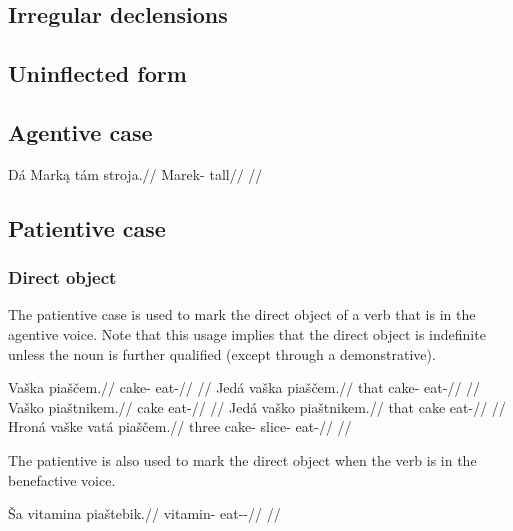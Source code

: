 \subsection{Irregular declensions}

\subsection{Uninflected form}


\subsection{Agentive case}

\pex
\begingl
\gla Dá Mark\k{a} tám stroja.//
\glb {} Marek-\Agt{} \Comp{} tall//
\glft {}//
\endgl
\xe


\subsection{Patientive case}

\subsubsection{Direct object}
The patientive case is used to mark the direct object of a verb that is in the agentive voice. Note that this usage implies that the direct object is indefinite unless the noun is further qualified (except through a demonstrative).

\pex
\a
\begingl
\gla Vaška piaščem.//
\glb cake-\Acc{} eat-//
\glft {}//
\endgl
\a
\begingl
\gla Jedá vaška piaščem.//
\glb that cake-\Acc{} eat-//
\glft {}//
\endgl
\a
\begingl
\gla Vaško piaštnikem.//
\glb cake eat-//
\glft {}//
\endgl
\a
\begingl
\gla Jedá vaško piaštnikem.//
\glb that cake eat-//
\glft {}//
\endgl
\a
\begingl
\gla Hroná vaške vatá piaščem.//
\glb three cake-\Gen{} slice-\Acc{} eat-//
\glft {}//
\endgl
\xe

The patientive is also used to mark the direct object when the verb is in the benefactive voice.

\pex
\begingl
\gla Ša vitamina piaštebik.//
\glb {} vitamin-\Acc{} eat-\Ben{}-\Pf{}//
\glft {}//
\endgl
\xe

